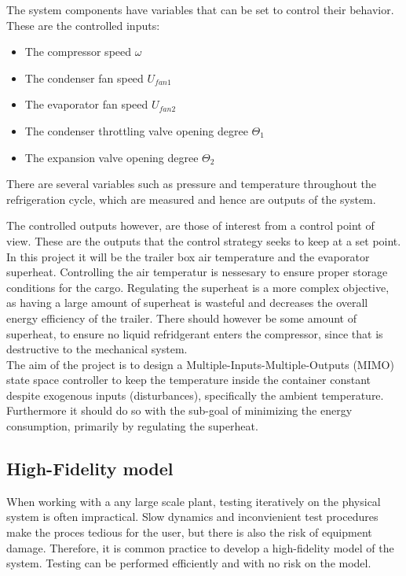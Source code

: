 The system components have variables that can be set to control their behavior. These are the controlled inputs:

\begin{itemize}
	\item The compressor speed $ \omega $
	\item The condenser fan speed $ U_{fan1} $
	\item The evaporator fan speed  $ U_{fan2} $
	\item The condenser throttling valve opening degree $ \Theta_1 $
	\item The expansion valve opening degree $ \Theta_2 $
\end{itemize}

There are several variables such as pressure and temperature throughout the refrigeration cycle, which are measured and hence are outputs of the system. 

The controlled outputs however, are those of interest from a control point of view. These are the outputs that the control strategy seeks to keep at a set point. In this project it will be the trailer box air temperature and the evaporator superheat. Controlling the air temperatur is nessesary to ensure proper storage conditions for the cargo. Regulating the superheat is a more complex objective, as having a large amount of superheat is wasteful and decreases the overall energy efficiency of the trailer. There should however be some amount of superheat, to ensure no liquid refridgerant enters the compressor, since that is destructive to the mechanical system.\\

The aim of the project is to design a Multiple-Inputs-Multiple-Outputs (MIMO) state space controller to keep the temperature inside the container constant despite exogenous inputs (disturbances), specifically the ambient temperature. Furthermore it should do so with the sub-goal of minimizing the energy consumption, primarily by regulating the superheat.\\





\subsection{High-Fidelity model}
When working with a any large scale plant, testing iteratively on the physical system is often impractical. Slow dynamics and inconvienient test procedures make the proces tedious for the user, but there is also the risk of equipment damage. Therefore, it is common practice to develop a high-fidelity model of the system. Testing can be performed efficiently and with no risk on the model. \\

